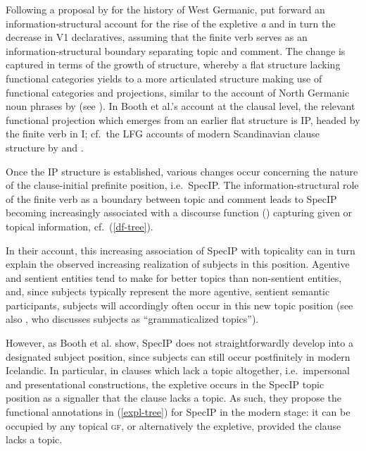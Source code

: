 \documentclass[output=paper,hidelinks]{langscibook}
\begin{document}
\noindent Following a proposal by \citet{hinterhoelzl-petrova2010} for the history of West Germanic, \citet{Booth17} put forward an information-structural account for the rise of the expletive \textit{{\th}a{\dh}} and in turn the decrease in V1 declaratives, assuming that the finite verb serves as an information-structural boundary separating topic and comment. The change is captured in terms of the growth of structure, whereby a flat structure lacking functional categories yields to a more articulated structure making use of functional categories and projections, similar to the account of North Germanic noun phrases by \citet{Borjarsetal16} (see ). In Booth et al.'s account at the clausal level, the relevant functional projection which  emerges from an earlier flat structure is IP, headed by the finite verb in I; cf.~the LFG accounts of modern Scandinavian clause structure by \citet{sellssao,Sells05} and \citet{BEA03}. 


Once the IP structure is established, various changes occur concerning the nature of the clause-initial prefinite position, i.e.~SpecIP. The information-structural role of the finite verb as a boundary between topic and comment leads to SpecIP becoming increasingly associated with a discourse function (\DF) capturing given or topical information, cf.~(\ref{df-tree}).

\begin{exe}
\ex {}
\end{exe}

\noindent In their account, this increasing association of SpecIP with topicality can in turn explain the observed increasing realization of subjects in this position. Agentive and sentient entities tend to make for better topics than non-sentient entities, and, since subjects typically represent the more agentive, sentient semantic participants, subjects will accordingly often occur in this new topic position (see also \citet{givon90}, who discusses subjects as ``grammaticalized topics''). 

However, as Booth et al. show, SpecIP does not straightforwardly develop into a designated subject position, since subjects can still occur postfinitely in modern Icelandic. In particular, in clauses which lack a topic altogether, i.e.~impersonal and presentational constructions, the expletive occurs in the SpecIP topic position as a signaller that the clause lacks a topic. As such, they propose the functional annotations in (\ref{expl-tree}) for SpecIP in the modern stage: it can be occupied by any topical \textsc{gf}, or alternatively the expletive, provided the clause lacks a topic.
\end{document}
